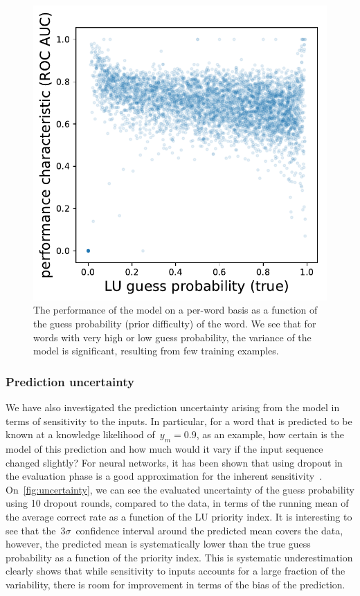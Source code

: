 \begin{figure}[ht]
\centering
\includegraphics[width=0.5\linewidth]{figures/lingvist/lu_roc_guess_proba.pdf}
\caption[Model performance on a per-LU basis as a function of average LU guess probability.]{The performance of the model on a per-word basis as a function of the guess probability (prior difficulty) of the word. We see that for words with very high or low guess probability, the variance of the model is significant, resulting from few training examples.}
\label{fig:lu_roc_guess_proba}
\end{figure}

\subsubsection{Prediction uncertainty}
We have also investigated the prediction uncertainty arising from the model in terms of sensitivity to the inputs. In particular, for a word that is predicted to be known at a knowledge likelihood of~$y_m=0.9$, as an example, how certain is the model of this prediction and how much would it vary if the input sequence changed slightly? For neural networks, it has been shown that using dropout in the evaluation phase is a good approximation for the inherent sensitivity~\cite{gal2016dropout}. On~\cref{fig:uncertainty}, we can see the evaluated uncertainty of the guess probability using 10 dropout rounds, compared to the data, in terms of the running mean of the average correct rate as a function of the LU priority index. It is interesting to see that the~$3\sigma$~confidence interval around the predicted mean covers the data, however, the predicted mean is systematically lower than the true guess probability as a function of the priority index. This is systematic underestimation clearly shows that while sensitivity to inputs accounts for a large fraction of the variability, there is room for improvement in terms of the bias of the prediction.  

